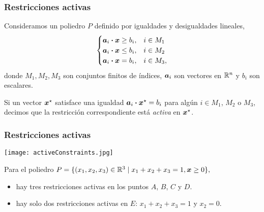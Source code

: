 \documentclass[aspectratio=169,12pt,spanish]{beamer}
\begin{document}
\begin{frame}
\frametitle{Restricciones activas}

Consideramos un poliedro $P$ definido por igualdades y desigualdades lineales,
$$
\begin{cases}
\bm{a}_i \boldsymbol{\cdot} \bm{x} \ge b_i, & i \in M_1 \\
\bm{a}_i \boldsymbol{\cdot} \bm{x} \le b_i, & i \in M_2 \\
\bm{a}_i \boldsymbol{\cdot} \bm{x} = b_i, & i \in M_3,
\end{cases}
$$
donde $M_1, M_2, M_3$ son conjuntos finitos de índices, $\bm{a}_i$ son vectores en $\mathbb{R}^n$ y $b_i$ son escalares.

\begin{definition}
Si un vector $\bm{x}^\star$ satisface una igualdad $\bm{a}_i \boldsymbol{\cdot} \bm{x}^\star = b_i$ para alg\'un $i \in M_1$, $M_2$ o $M_3$, decimos que la restricción correspondiente está \emph{activa} en $\bm{x}^\star$.
\end{definition}


\end{frame}


\begin{frame}
\frametitle{Restricciones activas}

\begin{center}
\texttt{[image: activeConstraints.jpg]}
\end{center}

Para el poliedro $P = \{(x_1, x_2, x_3) \in \mathbb{R}^3 \mid x_1 + x_2 + x_3 = 1, \bm{x} \ge 0\},$
\begin{itemize}
\item hay tres restricciones activas en los puntos $A$, $B$, $C$ y $D$.
\item hay solo dos restricciones activas en $E$: $x_1 + x_2 + x_3 = 1$ y $x_2 = 0$.
\end{itemize}

\end{frame}

\end{document}
